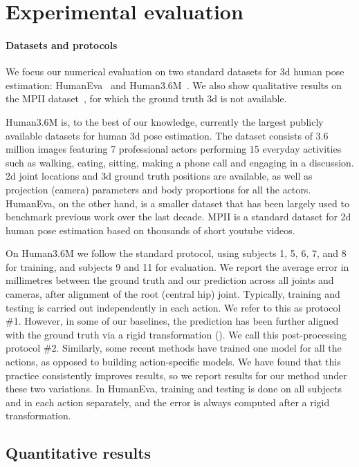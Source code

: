 \documentclass[10pt,twocolumn,letterpaper]{article}
\begin{document}
\section{Experimental evaluation}

\paragraph{Datasets and protocols} We focus our numerical evaluation on two standard datasets for 3d human pose estimation: HumanEva~\cite{heva} and Human3.6M~\cite{h36m}. We also show qualitative results on the MPII dataset~\cite{mpii}, for which the ground truth 3d is not available. 

Human3.6M is, to the best of our knowledge, currently the largest publicly available datasets for human 3d pose estimation. The dataset consists of 3.6 million images featuring 7 professional actors performing 15 everyday activities such as walking, eating, sitting, making a phone call and engaging in a discussion. 2d joint locations and 3d ground truth positions are available, as well as projection (camera) parameters and body proportions for all the actors. HumanEva, on the other hand, is a smaller dataset that has been largely used to benchmark previous work over the last decade. MPII is a standard dataset for 2d human pose estimation based on thousands of short youtube videos.

On Human3.6M we follow the standard protocol, using subjects 1, 5, 6, 7, and 8 for training, and subjects 9 and 11 for evaluation. We report the average error in millimetres between the ground truth and our prediction across all joints and cameras, after alignment of the root (central hip) joint. Typically, training and testing is carried out independently in each action. We refer to this as protocol \#1.
However, in some of our baselines, the prediction has been further aligned with the ground truth via a rigid transformation (\eg \cite{keep-it-simpl, distance-matrix}). We call this post-processing protocol \#2. Similarly, some recent methods have trained one model for all the actions, as opposed to building action-specific models. We have found that this practice consistently improves results, so we report results for our method under these two variations.
In HumanEva, training and testing is done on all subjects and in each action separately, and the error is always computed after a rigid transformation.

\subsection{Quantitative results}
\end{document}
